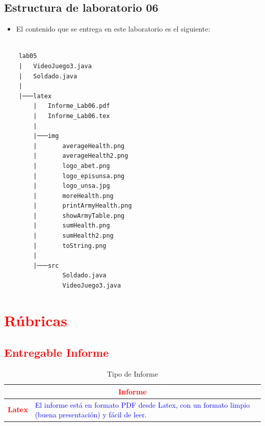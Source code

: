 \documentclass{article}
\begin{document}
	\subsection{Estructura de laboratorio 06}
    \begin{itemize}	
		\item El contenido que se entrega en este laboratorio es el siguiente:
	\end{itemize}
	
\begin{lstlisting}[style=ascii-tree]

    lab05
    |   VideoJuego3.java
    |   Soldado.java
    |
    |───latex
        |   Informe_Lab06.pdf
        |   Informe_Lab06.tex
        |
        |───img
        |       averageHealth.png
        |       averageHealth2.png
        |       logo_abet.png
        |       logo_episunsa.png
        |       logo_unsa.jpg
        |       moreHealth.png
        |       printArmyHealth.png
        |       showArmyTable.png
        |       sumHealth.png
        |       sumHealth2.png
        |       toString.png
        |
        |───src
                Soldado.java
                VideoJuego3.java

\end{lstlisting}    

	\section{\textcolor{red}{Rúbricas}}
	
	\subsection{\textcolor{red}{Entregable Informe}}
	\begin{table}[H]
		\caption{Tipo de Informe}
		\setlength{\tabcolsep}{0.5em} %
		{\renewcommand{\arraystretch}{1.5} %
		\begin{tabular}{|p{3cm}|p{12cm}|}
			\hline
			\multicolumn{2}{|c|}{\textbf{\textcolor{red}{Informe}}}  \\
			\hline 
			\textbf{\textcolor{red}{Latex}} & \textcolor{blue}{El informe está en formato PDF desde Latex,  con un formato limpio (buena presentación) y fácil de leer.}   \\ 
			\hline 
			
			
		\end{tabular}
	}
	\end{table}
	
\end{document}
